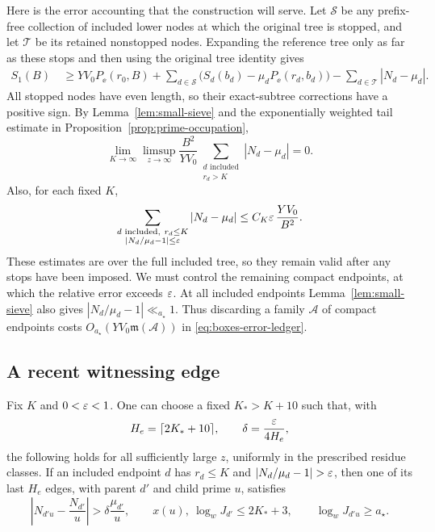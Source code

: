 Here is the error accounting that the construction will serve.  Let
$\mathcal S$ be any prefix-free collection of included lower nodes at
which the original tree is stopped, and let $\mathcal T$ be its retained
nonstopped nodes.  Expanding the reference tree only as far as these
stops and then using the original tree identity gives
\begin{align}
 S_1(B)\ &\ge YV_0 P_\ee(r_0,B)
   +\sum_{d\in\mathcal S}
       \bigl(S_d(b_d)-\mu_dP_\ee(r_d,b_d)\bigr)
   -\sum_{d\in\mathcal T}|N_d-\mu_d| .
 \label{eq:boxes-error-ledger}
\end{align}
All stopped nodes have even length, so their exact-subtree corrections
have a positive sign.  By Lemma~\ref{lem:small-sieve} and the
exponentially weighted tail estimate in
Proposition~\ref{prop:prime-occupation},
\begin{equation}\label{eq:boxes-large-gap-error}
 \lim_{K\to\infty}\limsup_{z\to\infty}
 \frac{B^2}{YV_0}
 \sum_{\substack{d\text{ included}\\r_d>K}}|N_d-\mu_d|=0.
\end{equation}
Also, for each fixed $K$,
\begin{equation}\label{eq:boxes-small-error}
 \sum_{\substack{d\text{ included},\ r_d\le K\\
                   |N_d/\mu_d-1|\le\varepsilon}}
       |N_d-\mu_d|
 \le C_K\varepsilon\,\frac{YV_0}{B^2}.
\end{equation}
These estimates are over the full included tree, so they remain valid
after any stops have been imposed.  We must control the remaining
compact endpoints, at which the relative error exceeds $\varepsilon$.
At all included endpoints Lemma~\ref{lem:small-sieve} also gives
$|N_d/\mu_d-1|\ll_{a_\star}1$.  Thus discarding a family
$\mathcal A$ of compact endpoints costs
$O_{a_\star}(YV_0\mathfrak m(\mathcal A))$ in
\eqref{eq:boxes-error-ledger}.

\subsection{A recent witnessing edge}

\begin{lemma}\label{lem:edge-witness}
Fix $K$ and $0<\varepsilon<1$.  One can choose a fixed
$K_*>K+10$ such that, with
\[
 H_e=\lceil 2K_*+10\rceil,\qquad
 \delta=\frac{\varepsilon}{4H_e},
\]
the following holds for all sufficiently large $z$, uniformly in the
prescribed residue classes.  If an included endpoint $d$ has
$r_d\le K$ and $|N_d/\mu_d-1|>\eps$, then one of its last $H_e$ edges,
with parent $d'$ and child prime $u$, satisfies
\begin{equation}\label{eq:boxes-witness}
 \left|N_{d'u}-\frac{N_{d'}}u\right|
       >\delta\frac{\mu_{d'}}u,
 \qquad
 x(u),\ \log_w J_{d'}\le 2K_*+3,
 \qquad
 \log_w J_{d'u}\ge a_\star.
\end{equation}
\end{lemma}

